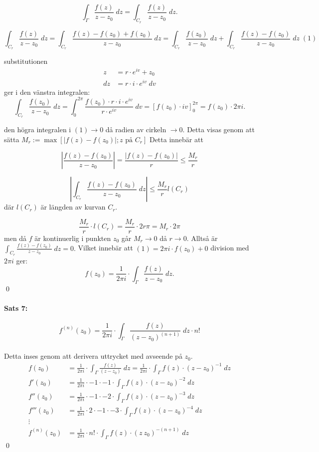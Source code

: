\documentclass{article}
\begin{document}
\[ \int_\Gamma \frac {f(z)} {z - z_0} \; dz = \int_{C_r} \frac {f(z)} {z - z_0} \; dz. \]

\[ \int_{C_r} \frac {f(z)} {z - z_0} \; dz = \int_{C_r} \frac {f(z) - f(z_0) + f(z_0)} {z - z_0} \; dz =
	\int_{C_r} \frac {f(z_0)} {z - z_0} \; dz + \int_{C_r} \frac {f(z) - f(z_0)} {z - z_0} \; dz \;(1) \]

substitutionen 
\begin{align*}
	z  &= r \cdot e^{iv} + z_0 \\
	dz &= r \cdot i \cdot e^{iv} \; dv
\end{align*}
ger i den vänstra integralen:
\[ \int_{C_r} \frac {f(z_0)} {z - z_0} \; dz = \int_0^{2\pi} \frac {f(z_0) \cdot r \cdot i \cdot e^{iv} } { r \cdot e^{iv}} \; dv =
	\left [f(z_0) \cdot iv \right ]_0^{2\pi} = f(z_0) \cdot 2 \pi i. \]

den högra integralen i $(1) \rightarrow 0$ då radien av cirkeln $\rightarrow 0$.
Detta visas genom att sätta $M_r := \operatorname{max} [|f(z) - f(z_0)|; z \text{ på } C_r]$
Detta innebär att

\[
	\left | \frac {f(z) - f(z_0)} {z - z_0} \right | = \frac {|f(z) - f(z_0)|} {r} \leq \frac {M_r} {r}
\]

\[
	\left | \int_{C_r} \frac {f(z) - f(z_0)} {z - z_0} \; dz \right | \leq \frac {M_r} {r} l(C_r)
\]
där $l(C_r)$ är längden av kurvan $C_r$.

\[
\frac {M_r} {r} \cdot l(C_r) = \frac {M_r} {r} \cdot 2r\pi = M_r \cdot 2 \pi
\]
men då $f$ är kontinuerlig i punkten $z_0$ går $M_r \rightarrow 0$ då $r \rightarrow 0$.
Alltså är $\int_{C_r} \frac {f(z) - f(z_0)} {z - z_0} \; dz = 0.$ Vilket innebär att $(1) = 2\pi i \cdot f(z_0) + 0$
division med $2\pi i$ ger:
\[
	f(z_0) = \frac {1} {2 \pi i} \cdot \int_{\Gamma} \frac {f(z)} {z - z_0} \; dz.
\]
\hfill \qed
\\

\paragraph{Sats 7:}
\[
	f^{(n)}(z_0) = \frac {1} {2 \pi i} \cdot \int_{\Gamma} \frac {f(z)} {(z - z_0)^{(n + 1)}} \; dz \cdot n!
\]
\\
Detta inses genom att derivera uttrycket med avseende på $z_0$.
\begin{align*}
	f(z_0) &= \frac {1} {2 \pi i} \cdot \int_{\Gamma} \frac {f(z)} {(z - z_0)} \; dz = \frac {1} {2 \pi i} \cdot \int_{\Gamma}
		f(z) \cdot (z - z_0)^{-1} \; dz \\
	f'(z_0) &= \frac {1} {2 \pi i} \cdot -1 \cdot -1 \cdot \int_{\Gamma} f(z) \cdot (z - z_0)^{-2} \; dz \\
	f''(z_0) &= \frac {1} {2 \pi i} \cdot -1 \cdot -2 \cdot \int_{\Gamma} f(z) \cdot (z - z_0)^{-3} \; dz \\
	f'''(z_0) &= \frac {1} {2 \pi i} \cdot 2 \cdot -1 \cdot -3 \cdot \int_{\Gamma} f(z) \cdot (z - z_0)^{-4} \; dz \\
	\vdots \\
	f^{(n)}(z_0) &= \frac {1} {2 \pi i} \cdot n! \cdot \int_\Gamma f(z) \cdot (z \ z_0)^{-(n + 1)} \; dz
\end{align*} %
\hfill \qed
\\
\end{document}
